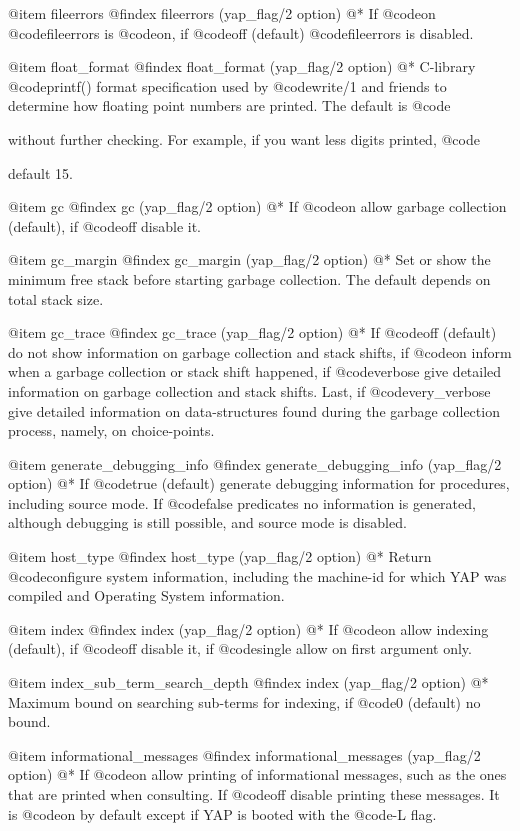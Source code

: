 {{{{{{{@item  fileerrors
@findex fileerrors (yap_flag/2 option)
@*
If @code{on} @code{fileerrors} is @code{on}, if @code{off} (default)
@code{fileerrors} is disabled.

@item float_format
@findex float_format (yap_flag/2 option)
@* C-library @code{printf()} format specification used by @code{write/1} and
friends to determine how floating point numbers are printed. The
default is @code{%
without further checking. For example, if you want less digits
printed, @code{%
default 15.

@item  gc
@findex gc (yap_flag/2 option)
@*
If @code{on} allow garbage collection (default), if @code{off} disable it.

@item  gc_margin
@findex gc_margin (yap_flag/2 option)
@*
Set or show the minimum free stack before starting garbage
collection. The default depends on total stack size. 

@item  gc_trace
@findex gc_trace (yap_flag/2 option)
@* If @code{off} (default) do not show information on garbage collection
and stack shifts, if @code{on} inform when a garbage collection or stack
shift happened, if @code{verbose} give detailed information on garbage
collection and stack shifts. Last, if @code{very_verbose} give detailed
information on data-structures found during the garbage collection
process, namely, on choice-points.

@item  generate_debugging_info
@findex generate_debugging_info (yap_flag/2 option)
@* If @code{true} (default) generate debugging information for
procedures, including source mode. If @code{false} predicates no
information is generated, although debugging is still possible, and
source mode is disabled.

@item  host_type
@findex host_type (yap_flag/2 option)
@* Return @code{configure} system information, including the machine-id
for which YAP was compiled and Operating System information. 

@item  index
@findex index (yap_flag/2 option)
@* If @code{on} allow indexing (default), if @code{off} disable it, if
@code{single} allow on first argument only.

@item  index_sub_term_search_depth
@findex index (yap_flag/2 option)
@*
Maximum bound on searching sub-terms for indexing, if @code{0} (default) no bound.

@item  informational_messages
@findex informational_messages (yap_flag/2 option)
@*
If @code{on} allow printing of informational messages, such as the ones
that are printed when consulting. If @code{off} disable printing
these messages. It is @code{on} by default except if YAP is booted with
the @code{-L} flag.

}}}}}}}}}
